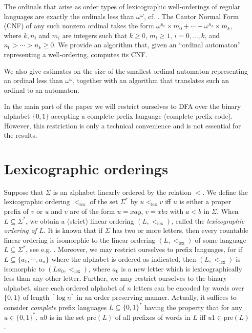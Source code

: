 \documentclass[copyright]{eptcs}
\newcommand{\zo}{\{0,1\}}
\newcommand{\zos}{\{0,1\}^*}
\newcommand{\lex}{<_{\mathrm{lex}}}
\newcommand{\pre}{\mathrm{pre}}
\begin{document}
The ordinals that arise as order types of lexicographic well-orderings 
of regular languages are exactly the ordinals less than $\omega^\omega$,
cf. \cite{BEord,Heilbrunner}. 
The Cantor Normal Form (CNF) \cite{Rosenstein} of any such nonzero ordinal 
takes the form
$\omega^{n_0}\times m_0 + \cdots + \omega^{n_k}\times m_k,$
where $k,n_i$ and $m_i$ are integers such that $k \geq 0$,
$m_i\geq 1$, $i = 0,\ldots,k$, and $n_0 >\cdots > n_k\geq 0$.
We provide an algorithm that, given an ``ordinal automaton'' 
representing a well-ordering, computes its CNF. 

We also give estimates on the size of the smallest ordinal automaton
representing an ordinal less than $\omega^\omega$, together with
an algorithm that translates such an ordinal to an automaton.

In the main part of the paper we will restrict ourselves to DFA over
the binary alphabet $\{0,1\}$ accepting a complete prefix language 
(complete prefix code). However, this restriction  
is only a technical convenience and is not essential for the results.


 


\section{Lexicographic orderings}


Suppose that $\Sigma$ is an alphabet linearly ordered by the relation $<$.
We define the lexicographic ordering $\lex$ of the set $\Sigma^*$ 
by $u \lex v$ iff $u$ is either a proper prefix of $v$ or $u$ and $v$ 
are of the form $u = xay$, $v = xbz$ with $a < b$ in $\Sigma$.
When $L\subseteq \Sigma^*$, we obtain a (strict) linear ordering 
$(L,\lex)$, called the \emph{lexicographic ordering of $L$}.
 It is known that if $\Sigma$ has two or more letters,
then every countable linear ordering is isomorphic to the
linear ordering $(L,\lex)$ of some language 
$L\subseteq \Sigma^*$, see e.g. \cite{BEord}. 
Moreover, we may restrict ourselves to prefix 
languages,
for if $L \subseteq \{a_1,\cdots,a_n\}$ where the 
alphabet is ordered as indicated, then  $(L,\lex)$ is isomorphic to $(La_0,\lex)$,
where $a_0$ is a new letter which is  lexicographically less than any other letter.
Further, we may restrict ourselves to the binary alphabet, 
since each ordered alphabet of $n$ letters can be encoded by words 
over $\zo$ of  length $\lceil \log n \rceil$ in an order preserving 
manner. 
Actually, it suffices to consider 
\emph{complete} prefix languages $L \subseteq \zos$ having the 
property that for any $u \in \zos$, $u0$ is in the set $\pre(L)$ 
of all prefixes of words in $L$ iff $u1 \in \pre(L)$. 
\end{document}

